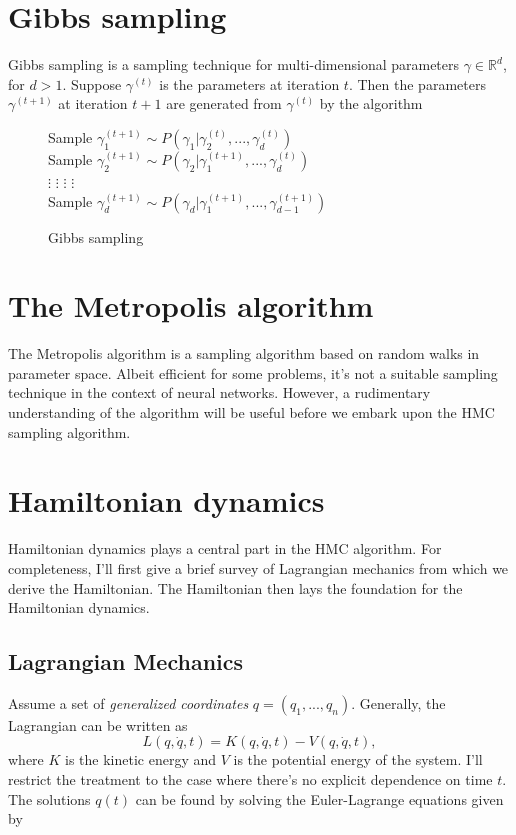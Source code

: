 \section{Gibbs sampling}
Gibbs sampling \cite{gibbs} is a sampling technique for multi-dimensional parameters $\gamma \in \mathbb{R}^d$, for $d > 1$.
Suppose $\gamma^{(t)}$ is the parameters at iteration $t$. Then the parameters $\gamma^{(t+1)}$ at iteration $t+1$ are generated from $\gamma^{(t)}$ by the algorithm

\begin{figure}[H]
  \begin{algorithm}[H]
    \caption{Gibbs sampling}
    \begin{algorithmic}
      \State Sample $\gamma^{(t+1)}_1 \sim P(\gamma_1|\gamma_2^{(t)},...,\gamma_d^{(t)})$ \\
      \State Sample $\gamma^{(t+1)}_2 \sim P(\gamma_2|\gamma_1^{(t+1)},...,\gamma_d^{(t)})$\\
      \State $\vdots$ \qquad  \qquad $\vdots$ \qquad  \qquad $\vdots$ \qquad \qquad $\vdots$\\
      \State Sample $\gamma^{(t+1)}_d \sim P(\gamma_d|\gamma_1^{(t+1)},...,\gamma_{d-1}^{(t+1)})$
    \end{algorithmic}
  \end{algorithm}
\end{figure}



\section{The Metropolis algorithm}
The Metropolis algorithm \cite{metropolis} is a sampling algorithm based on random walks in parameter space. Albeit efficient for some
problems, it's not a suitable sampling technique in the context of neural networks. However, a rudimentary understanding of the algorithm will be useful before we embark upon the HMC sampling algorithm.


\section{Hamiltonian dynamics}
Hamiltonian dynamics \cite{classical_mechanics} plays a central part in the HMC algorithm. For completeness, I'll first give a brief survey of Lagrangian mechanics from which we derive the Hamiltonian. The Hamiltonian then lays the foundation for the Hamiltonian dynamics.

\subsection{Lagrangian Mechanics}
Assume a set of \textit{generalized coordinates} $q = (q_1, ..., q_n)$. Generally, the Lagrangian can be written as
\begin{equation}
  L(q, \dot{q}, t) = K(q, \dot{q}, t) - V(q, \dot{q}, t),
\end{equation}
where $K$ is the kinetic energy and $V$ is the potential energy of the system. I'll restrict the treatment to the case where there's no explicit dependence on time $t$. The solutions $q(t)$ can be found by solving the Euler-Lagrange equations given by

